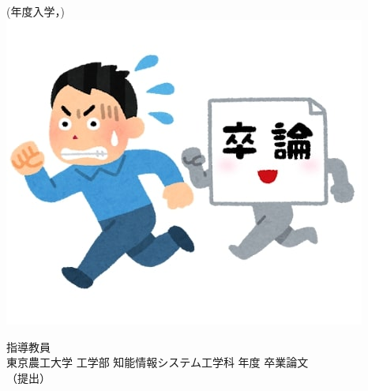 \documentclass[main]{subfiles}
\begin{document}
\begin{titlepage}
    \centering
    \vspace{10mm}
    {\LARGE \titleJaLarge}\\
    \vspace{3mm}
    {\LARGE \titleEnLarge}\\
    \vspace{25mm}
    {\Large \myNameJa \\ \large \myNameEn}\\
    \vspace{5mm}
    {(\yearOfEnrollment 年度入学，\studentNumber)}\\

    \vspace{5mm}
    \includegraphics[width=0.25\linewidth]{figures/sample_portrait.jpg}\\
    \vspace{5mm}

    {\Large 指導教員　\teacherName}\\
    \vspace{25mm}
    {\large 東京農工大学 工学部 知能情報システム工学科 \yearOfGraduation 年度 卒業論文}\\
    \vspace{5mm}
    {\large（\dateOfSubmission 提出）}
\end{titlepage}
\end{document}
